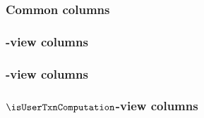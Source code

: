 \subsubsection{Common                         columns \lispDone{}}    \label{user txn data: generalities: columns: common}          
\subsubsection{\hubMod              {}-view   columns \lispDone{}}    \label{user txn data: generalities: columns: hub view}        
\subsubsection{\rlpTxnMod           {}-view   columns \lispDone{}}    \label{user txn data: generalities: columns: rlp view}        
\subsubsection{$\isUserTxnComputation$-view   columns \lispDone{}}    \label{user txn data: generalities: columns: computation}     
